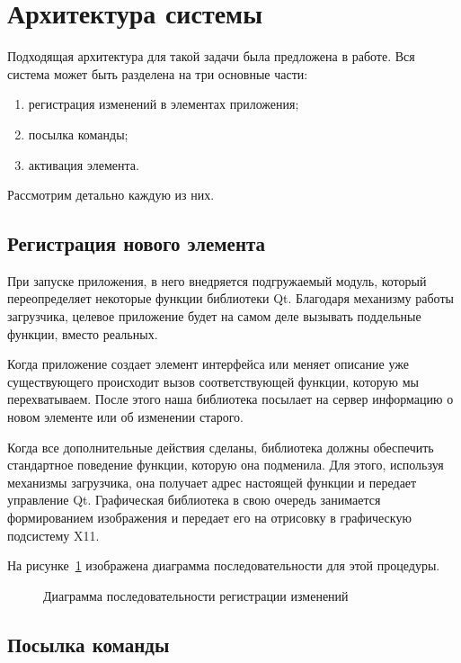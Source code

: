 \section{Архитектура системы}

Подходящая архитектура для такой задачи была предложена в
работе\cite{polshakovinject}. Вся система может быть разделена на три основные
части:

\begin{enumerate}
    \item регистрация изменений в элементах приложения;
    \item посылка команды;
    \item активация элемента.
\end{enumerate}

Рассмотрим детально каждую из них.

\subsection{Регистрация нового элемента}

При запуске приложения, в него внедряется подгружаемый модуль, который
переопределяет некоторые функции библиотеки Qt. Благодаря механизму работы
загрузчика, целевое приложение будет на самом деле вызывать поддельные
функции, вместо реальных.

Когда приложение создает элемент интерфейса или меняет описание уже
существующего происходит вызов соответствующей функции, которую мы
перехватываем. После этого наша библиотека посылает на сервер информацию
о новом элементе или об изменении старого.

Когда все дополнительные действия сделаны, библиотека должны обеспечить
стандартное поведение функции, которую она подменила. Для этого, используя
механизмы загрузчика, она получает адрес настоящей функции и передает
управление Qt. Графическая библиотека в свою очередь занимается формированием
изображения и передает его на отрисовку в графическую подсистему X11.

На рисунке~\ref{fig:create-elem} изображена диаграмма последовательности для
этой процедуры.

\begin{figure}[h]
	\centering
	
	\caption{Диаграмма последовательности регистрации
		изменений}\label{fig:create-elem}
\end{figure}

\subsection{Посылка команды}

